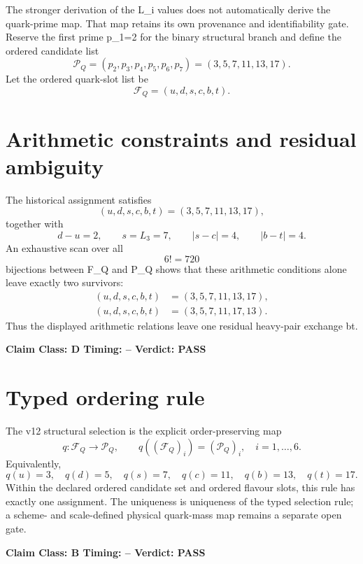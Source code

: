 \documentclass[11pt,a4paper,twoside]{book}
\def\({}%
\def\){}%
\theoremstyle{definition}
\newcommand{\vTwelveStatus}[3]{\par\noindent\textbf{Claim Class: #1 \quad Timing: #2 \quad Verdict: #3}\par}
\begin{document}
The stronger derivation of the \(L_i\) values does not automatically derive the
quark-prime map.  That map retains its own provenance and identifiability gate.
Reserve the first prime \(p_1=2\) for the binary structural branch and define the
ordered candidate list
\begin{equation}
\mathcal P_Q
=(p_2,p_3,p_4,p_5,p_6,p_7)
=(3,5,7,11,13,17).
\label{eq:v12-prime-candidate-list}
\end{equation}
Let the ordered quark-slot list be
\begin{equation}
\mathcal F_Q=(u,d,s,c,b,t).
\label{eq:v12-quark-slot-list}
\end{equation}

\section{Arithmetic constraints and residual ambiguity}

The historical assignment satisfies
\begin{equation}
(u,d,s,c,b,t)=(3,5,7,11,13,17),
\label{eq:v12-quark-prime-assignment}
\end{equation}
together with
\[
d-u=2,
\qquad
s=L_3=7,
\qquad
|s-c|=4,
\qquad
|b-t|=4.
\]
An exhaustive scan over all
\[
6!=720
\]
bijections between \(\mathcal F_Q\) and \(\mathcal P_Q\) shows that these
arithmetic conditions alone leave exactly two survivors:
\begin{align}
(u,d,s,c,b,t)&=(3,5,7,11,13,17),\\
(u,d,s,c,b,t)&=(3,5,7,11,17,13).
\end{align}
Thus the displayed arithmetic relations leave one residual heavy-pair exchange
\(b\leftrightarrow t\).
\vTwelveStatus{D}{--}{PASS}

\section{Typed ordering rule}

The v12 structural selection is the explicit order-preserving map
\begin{equation}
\boxed{
q:\mathcal F_Q\to\mathcal P_Q,
\qquad
q((\mathcal F_Q)_i)=(\mathcal P_Q)_i,
\quad i=1,\ldots,6.
}
\label{eq:v12-quark-prime-typed-rule}
\end{equation}
Equivalently,
\[
q(u)=3,\quad q(d)=5,\quad q(s)=7,\quad q(c)=11,\quad q(b)=13,\quad q(t)=17.
\]
Within the declared ordered candidate set and ordered flavour slots, this rule
has exactly one assignment.  The uniqueness is uniqueness of the typed
selection rule; a scheme- and scale-defined physical quark-mass map remains a
separate open gate.
\vTwelveStatus{B}{--}{PASS}
\end{document}

